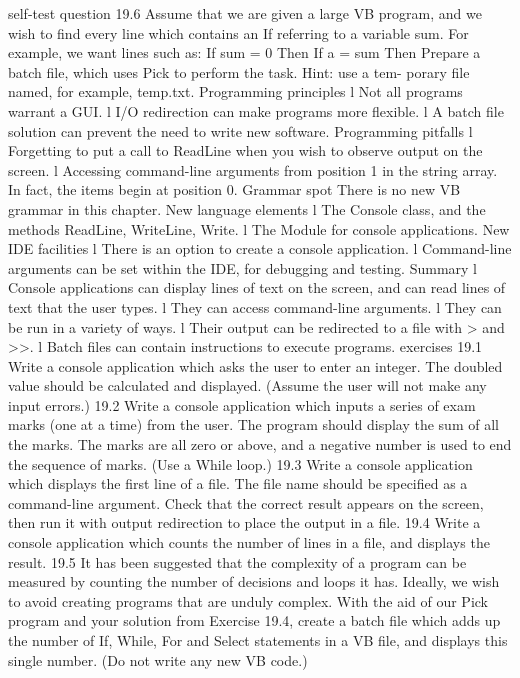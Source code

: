 self-test question
19.6	Assume that we are given a large VB program, and we wish to ﬁnd every line which contains an If referring to a variable sum. For example, we want lines such as:
If sum = 0 Then
If a = sum Then
	Prepare a batch ﬁle, which uses Pick to perform the task. Hint: use a tem-
porary ﬁle named, for example, temp.txt.
Programming principles
l	Not all programs warrant a GUI.
l	I/O redirection can make programs more ﬂexible.
l	A batch ﬁle solution can prevent the need to write new software.
Programming pitfalls
l	Forgetting to put a call to ReadLine when you wish to observe output on the screen.
l	Accessing command-line arguments from position 1 in the string array. In fact, the items begin at position 0.
Grammar spot
There is no new VB grammar in this chapter.
New language elements
l	The Console class, and the methods ReadLine, WriteLine, Write.
l	The Module for console applications.
New IDE facilities
l	There is an option to create a console application.
l	Command-line arguments can be set within the IDE, for debugging and 
testing.
Summary
l	Console applications can display lines of text on the screen, and can read lines of text that the user types.
l	They can access command-line arguments.
l	They can be run in a variety of ways.
l	Their output can be redirected to a ﬁle with > and >>.
l	Batch ﬁles can contain instructions to execute programs.
exercises
19.1	Write a console application which asks the user to enter an integer. The doubled value should be calculated and displayed. (Assume the user will not make any input errors.)
19.2	Write a console application which inputs a series of exam marks (one at a time) 
from the user. The program should display the sum of all the marks. The marks are all zero or above, and a negative number is used to end the sequence of marks. 
(Use a While loop.)
19.3	Write a console application which displays the ﬁrst line of a ﬁle. The ﬁle name should be speciﬁed as a command-line argument. Check that the correct result appears on the screen, then run it with output redirection to place the output in 
a ﬁle.
19.4	Write a console application which counts the number of lines in a ﬁle, and displays the result.
19.5	It has been suggested that the complexity of a program can be measured by counting the number of decisions and loops it has. Ideally, we wish to avoid creating programs that are unduly complex. With the aid of our Pick program and your solution from Exercise 19.4, create a batch ﬁle which adds up the number of If, While, For and Select statements in a VB ﬁle, and displays this single number.
(Do not write any new VB code.)
